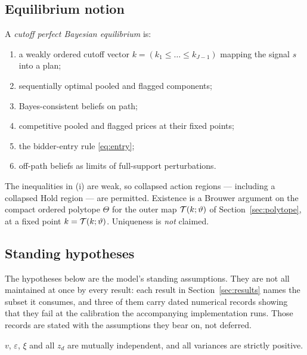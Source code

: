 \subsection{Equilibrium notion}
\label{sec:equilibrium-notion}

\begin{definition}
\label{def:cpbe}
A \emph{cutoff perfect Bayesian equilibrium} is:
\begin{enumerate}[label=(\roman*),leftmargin=2.4em,itemsep=3pt]
\item a weakly ordered cutoff vector $k = (k_1 \le \dots \le k_{J-1})$ mapping the signal $s$ into a
  plan;
\item sequentially optimal pooled and flagged components;
\item Bayes-consistent beliefs on path;
\item competitive pooled and flagged prices at their fixed points;
\item the bidder-entry rule \eqref{eq:entry};
\item off-path beliefs as limits of full-support perturbations.
\end{enumerate}
The inequalities in (i) are weak, so collapsed action regions --- including a collapsed Hold region
--- are permitted. Existence is a Brouwer argument on the compact ordered polytope $\Theta$ for the
outer map $\mathcal{T}(k;\vartheta)$ of Section~\ref{sec:polytope}, at a fixed point
$k = \mathcal{T}(k;\vartheta)$. Uniqueness is \emph{not} claimed.
\end{definition}

\subsection{Standing hypotheses}
\label{sec:hypotheses}

The hypotheses below are the model's standing assumptions. They are not all maintained at once by
every result: each result in Section~\ref{sec:results} names the subset it consumes, and three of
them carry dated numerical records showing that they fail at the calibration the accompanying
implementation runs. Those records are stated with the assumptions they bear on, not deferred.

\begin{assumption}
\label{asm:A1}
$v$, $\varepsilon$, $\xi$ and all $z_d$ are mutually independent, and all variances are strictly
positive.
\end{assumption}

